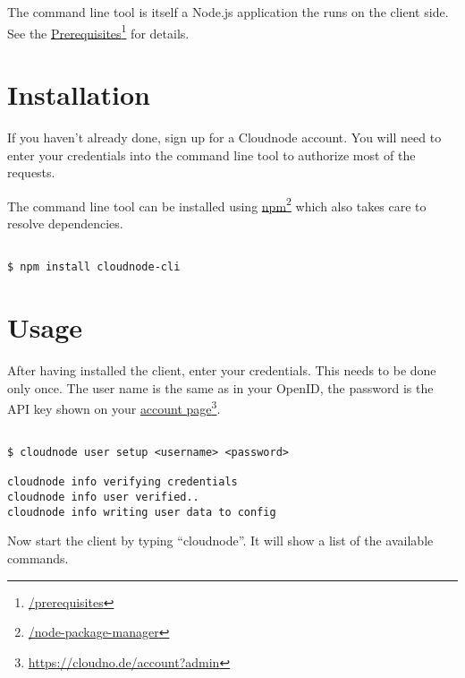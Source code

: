 The command line tool is itself a Node.js application the runs on the client side. See the \href{/prerequisites}{Prerequisites}\footnote{\href{/prerequisites}{\slash prerequisites}} for details.

\section{Installation}
\label{installation}

If you haven't already done, sign up for a Cloudnode account. You will need to enter your credentials into the command line tool to authorize most of the requests.

The command line tool can be installed using \href{/node-package-manager}{npm}\footnote{\href{/node-package-manager}{\slash node-package-manager}} which also takes care to resolve dependencies.

\begin{adjustwidth}{2.5em}{2.5em}
\begin{verbatim}

$ npm install cloudnode-cli

\end{verbatim}
\end{adjustwidth}

\section{Usage}
\label{usage}

After having installed the client, enter your credentials. This needs to be done only once. The user name is the same as in your OpenID, the password is the API key shown on your \href{https://cloudno.de/account?admin}{account page}\footnote{\href{https://cloudno.de/account?admin}{https:/\slash cloudno.de\slash account?admin}}.

\begin{adjustwidth}{2.5em}{2.5em}
\begin{verbatim}

$ cloudnode user setup <username> <password>

cloudnode info verifying credentials
cloudnode info user verified..
cloudnode info writing user data to config

\end{verbatim}
\end{adjustwidth}

Now start the client by typing ``cloudnode''. It will show a list of the available commands.

